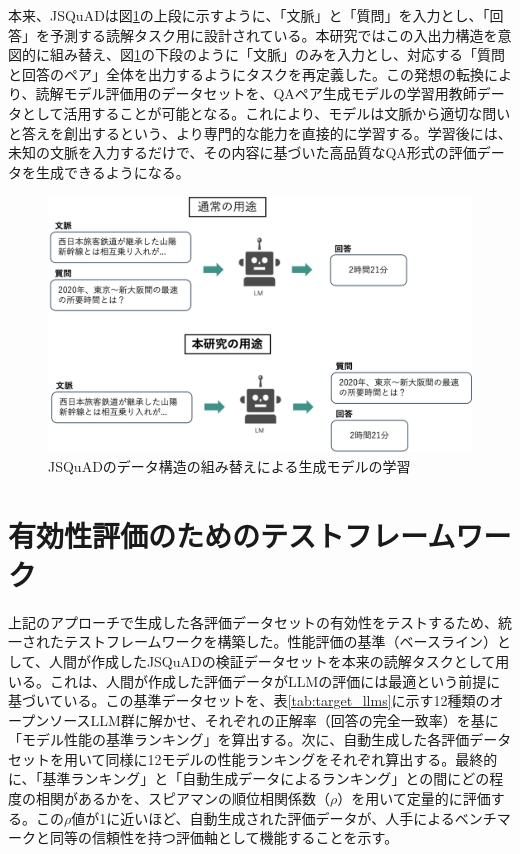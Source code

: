 \documentclass[a4paper,11pt]{jreport}
\begin{document}
本来、JSQuADは図\ref{fig:repurposing_jsquad}の上段に示すように、「文脈」と「質問」を入力とし、「回答」を予測する読解タスク用に設計されている。本研究ではこの入出力構造を意図的に組み替え、図\ref{fig:repurposing_jsquad}の下段のように「文脈」のみを入力とし、対応する「質問と回答のペア」全体を出力するようにタスクを再定義した。この発想の転換により、読解モデル評価用のデータセットを、QAペア生成モデルの学習用教師データとして活用することが可能となる。これにより、モデルは文脈から適切な問いと答えを創出するという、より専門的な能力を直接的に学習する。学習後には、未知の文脈を入力するだけで、その内容に基づいた高品質なQA形式の評価データを生成できるようになる。

\begin{figure}[t]
  \centering
  \includegraphics[width=\linewidth]{./fig/proposal_fig1.png}
  \caption{JSQuADのデータ構造の組み替えによる生成モデルの学習}
  \label{fig:repurposing_jsquad}
\end{figure}

\section{有効性評価のためのテストフレームワーク}
上記のアプローチで生成した各評価データセットの有効性をテストするため、統一されたテストフレームワークを構築した。性能評価の基準（ベースライン）として、人間が作成したJSQuADの検証データセットを本来の読解タスクとして用いる。これは、人間が作成した評価データがLLMの評価には最適という前提に基づいている。この基準データセットを、表\ref{tab:target_llms}に示す12種類のオープンソースLLM群に解かせ、それぞれの正解率（回答の完全一致率）を基に「モデル性能の基準ランキング」を算出する。次に、自動生成した各評価データセットを用いて同様に12モデルの性能ランキングをそれぞれ算出する。最終的に、「基準ランキング」と「自動生成データによるランキング」との間にどの程度の相関があるかを、スピアマンの順位相関係数（$\rho$）を用いて定量的に評価する。この$\rho$値が1に近いほど、自動生成された評価データが、人手によるベンチマークと同等の信頼性を持つ評価軸として機能することを示す。
\end{document}

